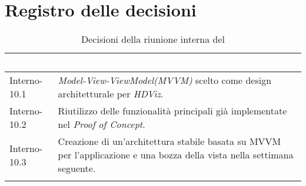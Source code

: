 \section{Registro delle decisioni}
{
\renewcommand{\arraystretch}{1.5}
\centering
\begin{longtable}{C{3cm} C{9cm}}
\textcolor{white}{\textbf{Codice}}&
\textcolor{white}{\textbf{Decisione}}\\	

\endhead
		
Interno-10.1 & \textit{Model-View-ViewModel(MVVM)} scelto come design architetturale per \textit{HDViz}.\\
Interno-10.2 & Riutilizzo delle funzionalità principali già implementate nel \textit{Proof of Concept}.\\
Interno-10.3 & Creazione di un'architettura stabile basata su MVVM per l'applicazione e una bozza della vista nella settimana seguente.\\

\caption{Decisioni della riunione interna del \Data{}}
\end{longtable}
}

